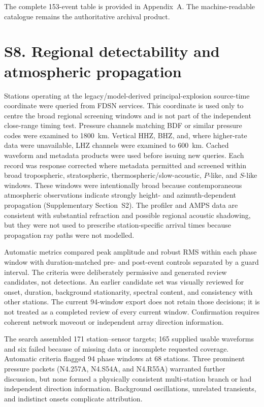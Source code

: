 \documentclass[]{seismica}
\begin{document}
The complete 153-event table is provided in Appendix~A. The machine-readable
catalogue remains the authoritative archival product.


\section*{S8. Regional detectability and atmospheric propagation}
\label{sec:supp_regional}

Stations operating at the legacy/model-derived principal-explosion source-time coordinate were queried from
FDSN services. This coordinate is used only to centre the broad regional screening windows and is not part of the independent close-range timing test. Pressure channels matching BDF or similar pressure codes were
examined to 1800~km. Vertical HHZ, BHZ, and, where higher-rate data were
unavailable, LHZ channels were examined to 600~km. Cached waveform and metadata
products were used before issuing new queries. Each record was response
corrected where metadata permitted and screened within broad tropospheric,
stratospheric, thermospheric/slow-acoustic, $P$-like, and $S$-like windows.
These windows were intentionally broad because contemporaneous atmospheric
observations indicate strongly height- and azimuth-dependent propagation
(Supplementary Section~S2). The profiler and AMPS data are consistent with
substantial refraction and possible regional acoustic shadowing, but they were
not used to prescribe station-specific arrival times because propagation ray
paths were not modelled.

Automatic metrics compared peak amplitude and robust RMS within each phase
window with duration-matched pre- and post-event controls separated by a guard
interval. The criteria were deliberately permissive and generated review
candidates, not detections. An earlier candidate set was visually reviewed for onset, duration, background
stationarity, spectral content, and consistency with other stations. The current
94-window export does not retain those decisions; it is not treated as a
completed review of every current window. Confirmation requires coherent network
moveout or independent array direction information.

The search assembled 171 station--sensor targets; 165 supplied usable
waveforms and six failed because of missing data or incomplete requested
coverage. Automatic criteria flagged 94 phase windows at 68 stations. Three
prominent pressure packets (N4.257A, N4.S54A, and N4.R55A) warranted further
discussion, but none formed a physically consistent multi-station branch or
had independent direction information. Background oscillations, unrelated
transients, and indistinct onsets complicate attribution.
\end{document}
